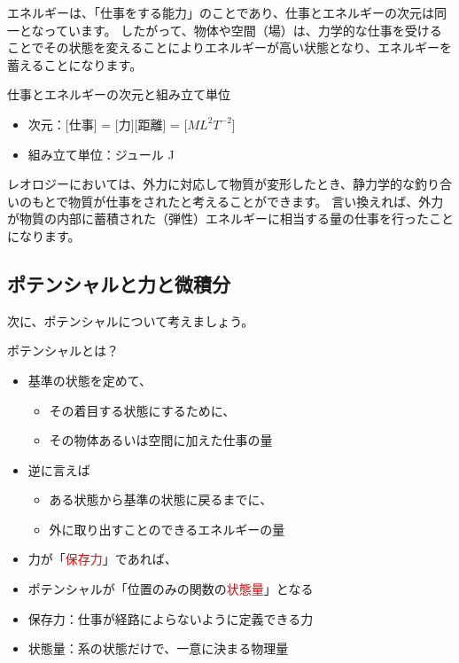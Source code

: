 \documentclass[uplatex,dvipdfmx,a4paper,11pt]{jsarticle}
\begin{document}
エネルギーは、「仕事をする能力」のことであり、仕事とエネルギーの次元は同一となっています。
したがって、物体や空間（場）は、力学的な仕事を受けることでその状態を変えることによりエネルギーが高い状態となり、エネルギーを蓄えることになります。
\large
\begin{itembox}[l]{仕事とエネルギーの次元と組み立て単位}
	\begin{itemize}
		\item 次元：[仕事] = [力][距離] = [$ML^2T^{-2}$]
		\item 組み立て単位：ジュール J
	\end{itemize}
\end{itembox}
\normalsize

レオロジーにおいては、外力に対応して物質が変形したとき、静力学的な釣り合いのもとで物質が仕事をされたと考えることができます。
言い換えれば、外力が物質の内部に蓄積された（弾性）エネルギーに相当する量の仕事を行ったことになります。

\subsection{ポテンシャルと力と微積分}
次に、ポテンシャルについて考えましょう。
\large
\begin{itembox}[l]{ポテンシャルとは？}
	\begin{itemize}
		\item 基準の状態を定めて、
		\begin{itemize}
			\item その着目する状態にするために、
			\item その物体あるいは空間に加えた仕事の量
		\end{itemize}
		\item 逆に言えば
		\begin{itemize}
			\item ある状態から基準の状態に戻るまでに、
			\item 外に取り出すことのできるエネルギーの量
		\end{itemize}
		\item 力が「\textcolor{red}{保存力}」であれば、
		\item ポテンシャルが「位置のみの関数の\textcolor{red}{状態量}」となる
	\end{itemize}
	\begin{screen}
		\begin{itemize}
			\item 保存力：仕事が経路によらないように定義できる力
			\item 状態量：系の状態だけで、一意に決まる物理量
		\end{itemize}
	\end{screen}
\end{itembox}
\normalsize
\end{document}
